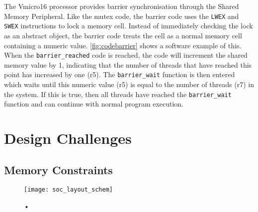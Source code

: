 The Vmicro16 processor provides barrier synchronisation through the Shared Memory Peripheral. Like the mutex code, the barrier code uses the \verb|LWEX| and \verb|SWEX| instructions to lock a memory cell. Instead of immediately checking the lock as an abstract object, the barrier code treats the cell as a normal memory cell containing a numeric value. \cref{fig:codebarrier} shows a software example of this. When the \verb|barrier_reached| code is reached, the code will increment the shared memory value by 1, indicating that the number of threads that have reached this point has increased by one (r5). The \verb|barrier_wait| function is then entered which waits until this numeric value (r5) is equal to the number of threads (r7) in the system. If this is true, then all threads have reached the \verb|barrier_wait| function and can continue with normal program execution.

\section{Design Challenges}
\subsection{Memory Constraints}


\begin{figure}[H]
\centering
\texttt{[image: soc\_layout\_schem]}
\caption{•}
\label{}
\end{figure}